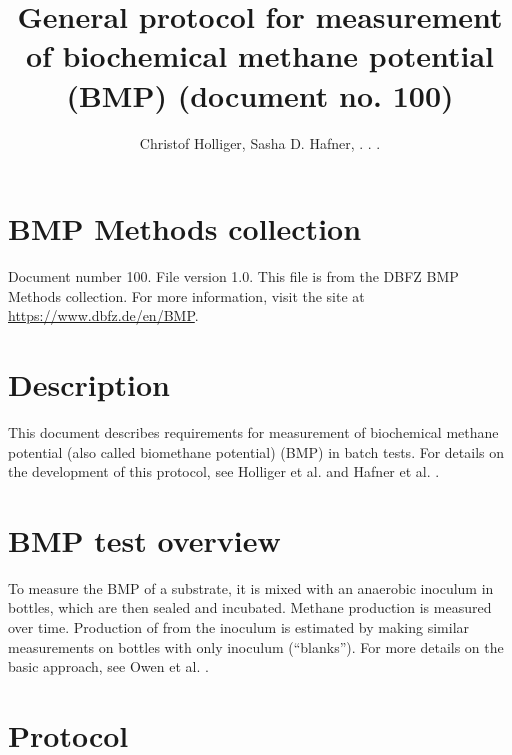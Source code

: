 \documentclass[]{article}
\title {General protocol for measurement of biochemical methane potential (BMP) (document no. 100)}
\author{Christof Holliger, Sasha D. Hafner, . . .  }
\begin{document}
\maketitle

\section{BMP Methods collection}
Document number 100.
File version 1.0. 
This file is from the DBFZ BMP Methods collection.
For more information, visit the site at \url{https://www.dbfz.de/en/BMP}.

\section{Description}
This document describes requirements for measurement of biochemical methane potential (also called biomethane potential) (BMP) in batch tests.
For details on the development of this protocol, see Holliger et al. \cite{iis2016} and Hafner et al. \cite{iis2020}.

\section{BMP test overview}
To measure the BMP of a substrate, it is mixed with an anaerobic inoculum in bottles, which are then sealed and incubated. 
Methane  production is measured over time.
Production of  from the inoculum is estimated by making similar measurements on bottles with only inoculum (``blanks'').
For more details on the basic approach, see Owen et al. \cite{owen1979}.

\section{Protocol}
\end{document}
